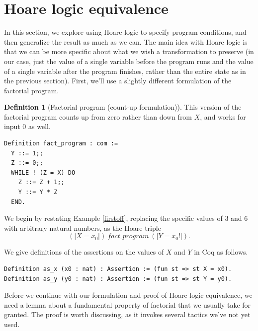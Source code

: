 \documentclass[12pt,notitlepage]{report}
\theoremstyle{plain}
\theoremstyle{definition}
\newtheorem{defin}[theo]{Definition}
\numberwithin{equation}{section}
\begin{document}
\section{Hoare logic equivalence}\label{hoarequiv}

In this section, we explore using Hoare logic to specify program conditions, and then generalize the result as much as we can.  The main idea with Hoare logic is that we can be more specific about what we wish a transformation to preserve (in our case, just the value of a single variable before the program runs and the value of a single variable after the program finishes, rather than the entire state as in the previous section).  First, we'll use a slightly different formulation of the factorial program.

\begin{defin}[Factorial program (count-up formulation)]
This version of the factorial program counts up from zero rather than down from $X$, and works for input $0$ as well.
\begin{verbatim}
Definition fact_program : com :=
  Y ::= 1;;
  Z ::= 0;;
  WHILE ! (Z = X) DO
    Z ::= Z + 1;;
    Y ::= Y * Z
  END.
\end{verbatim}
\end{defin}

We begin by restating Example \ref{firstoff}, replacing the specific values of $3$ and $6$ with arbitrary natural numbers, as the Hoare triple
\[
    (| X = x_0 |)\ fact\_program\ (| Y = x_0! |).
\]

We give definitions of the assertions on the values of $X$ and $Y$ in Coq as follows.

\begin{verbatim}
Definition as_x (x0 : nat) : Assertion := (fun st => st X = x0).
Definition as_y (y0 : nat) : Assertion := (fun st => st Y = y0).
\end{verbatim}

Before we continue with our formulation and proof of Hoare logic equivalence, we need a lemma about a fundamental property of factorial that we usually take for granted.  The proof is worth discussing, as it invokes several tactics we've not yet used.
\end{document}

